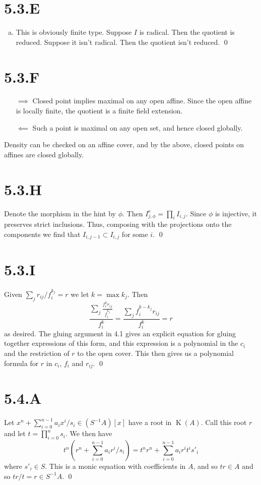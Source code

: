 \documentclass{article}
\begin{document}
\section{5.3.E}
\begin{enumerate}[a.]
    \item This is obviously finite type. Suppose $I$ is radical. Then the quotient is reduced. Suppose it isn't radical. Then the quotient isn't reduced. \qed
\end{enumerate}

\section{5.3.F}
\begin{enumerate}[a.]
    \item [$\implies$] Closed point implies maximal on any open affine. Since the open affine is locally finite, the quotient is a finite field extension.
    \item [$\impliedby$] Such a point is maximal on any open set, and hence closed globally.
\end{enumerate}
Density can be checked on an affine cover, and by the above, closed points on affines are closed globally.

\section{5.3.H}
Denote the morphism in the hint by $\phi$. Then $I_{j,\phi}^{\text{e}}=\prod_i I_{i,j}$. Since $\phi$ is injective, it preserves strict inclusions. Thus, composing with the projections onto the components we find that $I_{i,j-1} \subset I_{i,j}$ for some $i$. \qed

\section{5.3.I}
Given $\sum_j r_{ij}/f_i^{k_j}=r$ we let $k=\max k_j$. Then
\[
    \frac{\sum_j \frac{f_i^kr_{ij}}{f_i^{k_j}}}{f_i^k}=\frac{\sum_j f_i^{k-k_j}r_{ij}}{f_i^k}=r
\]
as desired. The gluing argument in 4.1 gives an explicit equation for gluing together expressions of this form, and this expression is a polynomial in the $c_i$ and the restriction of $r$ to the open cover. This then gives us a polynomial formula for $r$ in $c_i$, $f_i$ and $r_{ij}$. \qed

\section{5.4.A}
Let $x^n+\sum_{i=0}^{n-1} a_ix^i/s_i \in (S^{-1}A)[x]$ have a root in $\operatorname{K}(A)$. Call this root $r$ and let $t=\prod_{i=0}^n s_i$. We then have
\[
    t^n(r^n+\sum_{i=0}^{n-1} a_ir^i/s_i)=t^nr^n+\sum_{i=0}^{n-1} a_ir^it^is'_i
\]
where $s'_i \in S$. This is a monic equation with coefficients in $A$, and so $tr \in A$ and so $tr/t=r \in S^{-1}A$. \qed
\end{document}
